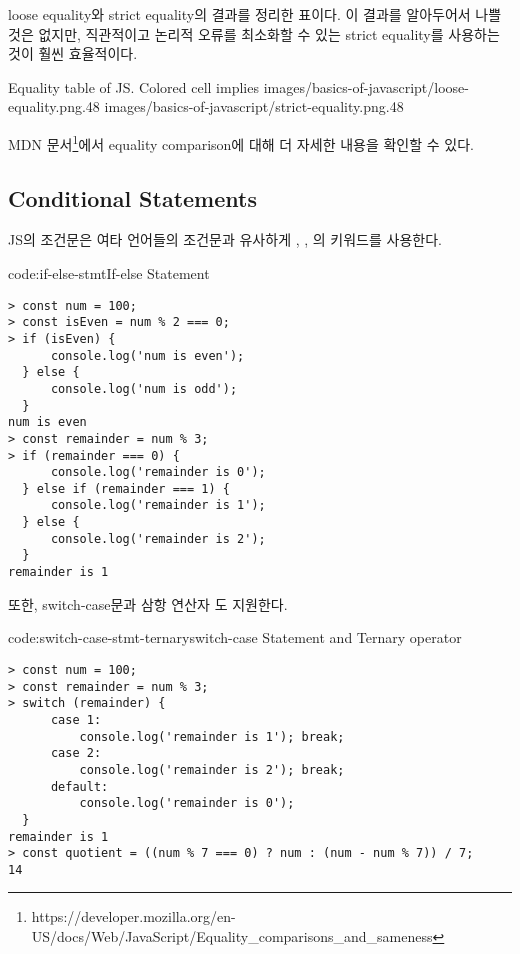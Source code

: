 \은 loose equality와 strict equality의 결과를 정리한 표이다. 이 결과를 알아두어서 나쁠 것은 없지만, 직관적이고 논리적 오류를 최소화할 수 있는 strict equality를 사용하는 것이 훨씬 효율적이다.

    {Equality table of JS. Colored cell implies \protect\footnotemark}{
        {images/basics-of-javascript/loose-equality.png}{.48}
        {images/basics-of-javascript/strict-equality.png}{.48}
}


MDN 문서\footnote{https://developer.mozilla.org/en-US/docs/Web/JavaScript/Equality\_comparisons\_and\_sameness}에서 equality comparison에 대해 더 자세한 내용을 확인할 수 있다.

\subsection*{Conditional Statements}

JS의 조건문은 여타 언어들의 조건문과 유사하게 , , 의 키워드를 사용한다.

\begin{codeenv}{code:if-else-stmt}{If-else Statement}\begin{verbatim}
> const num = 100;
> const isEven = num % 2 === 0;
> if (isEven) {
      console.log('num is even');
  } else {
      console.log('num is odd');
  }
num is even
> const remainder = num % 3;
> if (remainder === 0) {
      console.log('remainder is 0');
  } else if (remainder === 1) {
      console.log('remainder is 1');
  } else {
      console.log('remainder is 2');
  }
remainder is 1
\end{verbatim}
\end{codeenv}
\newpage

또한, switch-case문과 삼항 연산자 도 지원한다.

\begin{codeenv}{code:switch-case-stmt-ternary}{switch-case Statement and Ternary operator}\begin{verbatim}
> const num = 100;
> const remainder = num % 3;
> switch (remainder) {
      case 1:
          console.log('remainder is 1'); break;
      case 2:
          console.log('remainder is 2'); break;
      default:
          console.log('remainder is 0');
  }
remainder is 1
> const quotient = ((num % 7 === 0) ? num : (num - num % 7)) / 7;
14
\end{verbatim}
\end{codeenv}

